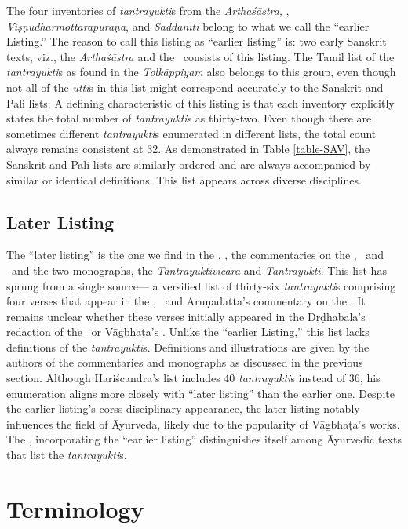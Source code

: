 The four inventories of \emph{tantrayukti}s from the \emph{Arthaśāstra}, \SS, \emph{Viṣṇudharmottarapurāṇa}, and \emph{Saddanīti} belong to what we call the “earlier Listing.” The reason to call this listing as “earlier listing” is: two early Sanskrit texts, viz., the \emph{Arthaśāstra} and the \SS\ consists of this listing. The Tamil list of the \emph{tantrayukti}s as found in the \emph{Tolkāppiyam} also belongs to this group, even though not all of the \emph{utti}s in this list might correspond accurately to the Sanskrit and Pali lists. A defining characteristic of this listing is that each inventory explicitly states the total number of \emph{tantrayukti}s as thirty-two. Even though there are sometimes different \emph{tantrayukti}s enumerated in different lists, the total count always remains consistent at 32. As demonstrated in Table \ref{table-SAV}, the Sanskrit and Pali lists are similarly ordered and are always accompanied by similar or identical definitions. This list appears across diverse disciplines.

\subsection{Later Listing}

The “later listing” is the one we find in the \AS, \CS, the commentaries on the \CS, \AS\ and \AHS\ and the two monographs, the \emph{Tantrayuktivicāra} and \emph{Tantrayukti}. This list has sprung from a single source--- a versified list of thirty-six \emph{tantrayukti}s comprising four verses that appear in the \AS, \CS\ and Aruṇadatta's commentary on the \AHS. It remains unclear whether these verses initially appeared in the Dṛḍhabala's redaction of the \CS\ or Vāgbhaṭa's \AS. Unlike the “earlier Listing,” this list lacks definitions of the \emph{tantrayukti}s. Definitions and illustrations are given by the authors of the commentaries and monographs as discussed in the previous section. Although Hariścandra's list includes 40 \emph{tantrayukti}s instead of 36, his enumeration aligns more closely with “later listing” than the earlier one. Despite the earlier listing's corss-disciplinary appearance, the later listing notably influences the field of Āyurveda, likely due to the popularity of Vāgbhaṭa's works. The \SS, incorporating the “earlier listing” distinguishes itself among Āyurvedic texts that list the \emph{tantrayukti}s.  

\section{Terminology}

